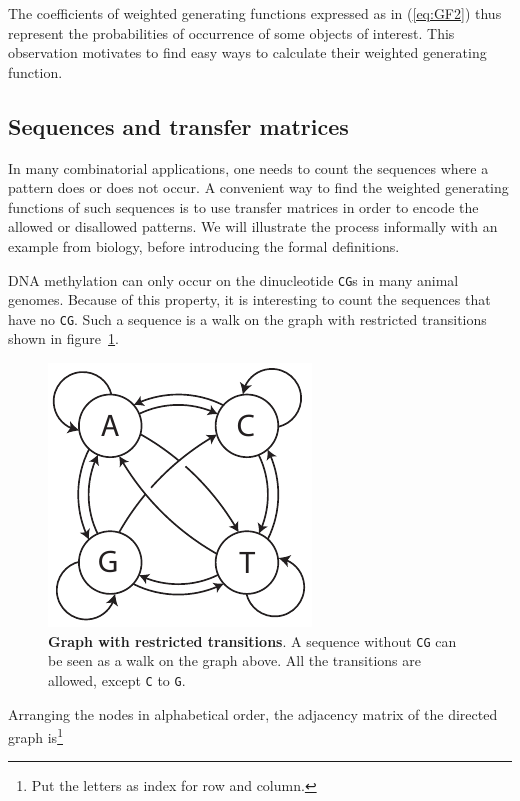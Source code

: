 \documentclass{article}
\begin{document}
The coefficients of weighted generating functions expressed as in
(\ref{eq:GF2}) thus represent the probabilities of occurrence of some
objects of interest. This observation motivates to find easy ways to
calculate their weighted generating function.




\subsection{Sequences and transfer matrices}

In many combinatorial applications, one needs to count the sequences where
a pattern does or does not occur. A convenient way to find the weighted
generating functions of such sequences is to use transfer matrices in
order to encode the allowed or disallowed patterns. We will illustrate
the process informally with an example from biology, before introducing
the formal definitions.

DNA methylation can only occur on the dinucleotide \texttt{CG}s in many
animal genomes. Because of this property, it is interesting to count the
sequences that have no \texttt{CG}. Such a sequence is a walk on the
graph with restricted transitions shown in figure~\ref{fig:CG_transtions}.

\begin{figure}[h]
\centering
\includegraphics[scale=0.9]{CG_transitions.pdf}
\caption{\textbf{Graph with restricted transitions}.
A sequence without \texttt{CG} can be seen as a walk on the graph above.
All the transitions are allowed, except \texttt{C} to \texttt{G}.}
\label{fig:CG_transtions}
\end{figure}

Arranging the nodes in alphabetical order, the adjacency matrix of the
directed graph is\footnote{Put the letters as index for row and column.}
\end{document}
